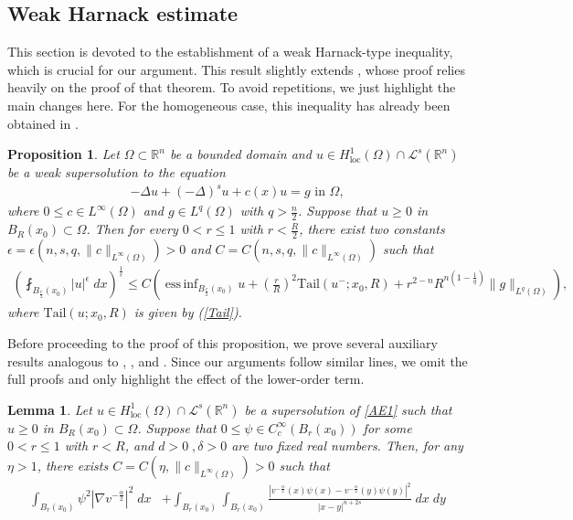 \documentclass[11pt, notitlepage]{article}
\def\R{\mathbb{R}}
\DeclareMathOperator*{\essinf}{ess\,inf}
\newcommand{\De} {\Delta}
\newtheorem{Lemma}[Theorem]{Lemma}
\newtheorem{prop}[Theorem]{Proposition}
\begin{document}
{\subsection{Weak Harnack estimate}
This section is devoted to the establishment of a weak Harnack-type inequality, which is crucial for our argument. This result slightly extends \cite[Theorem 1.1]{Garain25}, whose proof relies heavily on the proof of that theorem. To avoid repetitions, we just highlight the main changes here. For the homogeneous case, this inequality has already been obtained in \cite[Proposition 3.3]{BV24}. 
  \begin{prop}\label{WHI}
      Let $\Omega\subset \R^n$ be a bounded domain and $u\in H^1_{\mathrm{loc}}(\Omega)\cap \mathcal{L}^s(\R^n)$ be a weak supersolution to the equation 
      \begin{align}\label{AE1}
          -\De u+(-\De)^su+c(x)u=g \text{ in }\Omega,
      \end{align}
where $0\leq c\in L^\infty(\Omega)$ and $g\in L^q(\Omega)$ with $q>\frac{n}{2}$. Suppose that $u\geq 0$ in $B_R(x_0)\subset\Omega$. Then for every $0<r\leq 1$ with $r<\frac{R}{2}$, there exist two constants $\epsilon=\epsilon(n,s,q,\|c\|_{L^\infty(\Omega)})>0$ and $C=C(n,s,q,\|c\|_{L^\infty(\Omega)})$ such that
\begin{align}\label{WH}
    \left( \fint_{B_{\frac{r}{2}}(x_0)} |u|^\epsilon\;dx\right)^\frac{1}{\epsilon}\leq C\left( \essinf_{B_{\frac{r}{2}}(x_0)} u+\left(\frac{r}{R}\right)^2 \mathrm{Tail}(u^-;x_0,R)+r^{2-n}R^{n(1-\frac{1}{q})}\|g\|_{L^q(\Omega)} \right),
\end{align}
where $\mathrm{Tail}(u;x_0,R)$ is given by (\ref{Tail}).
\end{prop}
Before proceeding to the proof of this proposition, we prove several auxiliary results analogous to \cite[Lemma 3.1]{Garain25}, \cite[Lemma 3.2]{Garain25}, and \cite[Lemma 4.1]{Garain25}. Since our arguments follow similar lines, we omit the full proofs and only highlight the effect of the lower-order term.
\begin{Lemma}
    Let $u\in H^1_{\mathrm{loc}}(\Omega)\cap \mathcal{L}^s(\R^n)$ be a supersolution of \eqref{AE1} such that $u\geq 0$ in $B_R(x_0)\subset\Omega$. Suppose that $0\leq \psi\in C^\infty_c(B_r(x_0))$ for some $0<r\leq1$ with $r<R$, and $d>0\;, \delta>0$ are two fixed real numbers. Then, for any $\eta>1$, there exists $C=C(\eta,\|c\|_{L^\infty(\Omega)})>0$ such that 
    \begin{align}\label{Energy}
        \int_{B_r(x_0)}\psi^2|\nabla v^{-\frac{\alpha}{2}}|^2\;dx&+\int_{B_r(x_0)}\int_{B_r(x_0)}\frac{|v^{-\frac{\alpha}{2}}(x)\psi(x)-v^{-\frac{\alpha}{2}}(y)\psi(y)|^2}{|x-y|^{n+2s}}\;dx\;dy\nonumber\\

\end{align}
\end{Lemma}}
\end{document}
